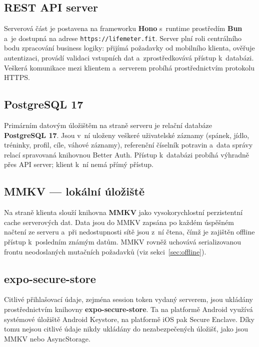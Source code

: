 \subsection*{REST API server}

Serverová část je postavena na frameworku \textbf{Hono} s~runtime
prostředím \textbf{Bun} a~je dostupná na adrese
\texttt{https://lifemeter.fit}. Server plní roli centrálního bodu
zpracování business logiky: přijímá požadavky od mobilního klienta,
ověřuje autentizaci, provádí validaci vstupních dat a~zprostředkovává
přístup k~databázi. Veškerá komunikace mezi klientem a~serverem
probíhá prostřednictvím protokolu HTTPS.

\subsection*{PostgreSQL 17}

Primárním datovým úložištěm na straně serveru je relační databáze
\textbf{PostgreSQL 17}. Jsou v~ní uloženy veškeré uživatelské záznamy
(spánek, jídlo, tréninky, profil, cíle, váhové záznamy), referenční
číselník potravin a~data správy relací spravovaná knihovnou Better Auth.
Přístup k~databázi probíhá výhradně přes API server; klient k~ní
nemá přímý přístup.

\subsection*{MMKV — lokální úložiště}

Na straně klienta slouží knihovna \textbf{MMKV} jako vysokorychlostní
perzistentní cache serverových dat. Data jsou do MMKV zapsána po každém
úspěšném načtení ze serveru a~při nedostupnosti sítě jsou z~ní čtena,
čímž je zajištěn offline přístup k~posledním známým datům. MMKV rovněž
uchovává serializovanou frontu neodoslaných mutačních požadavků
(viz sekci~\ref{sec:offline}).

\subsection*{expo-secure-store}

Citlivé přihlašovací údaje, zejména session token vydaný serverem,
jsou ukládány prostřednictvím knihovny \textbf{expo-secure-store}.
Ta na platformě Android využívá systémové úložiště Android Keystore,
na platformě iOS pak Secure Enclave. Díky tomu nejsou citlivé údaje
nikdy ukládány do nezabezpečených úložišť, jako jsou MMKV nebo
AsyncStorage.

